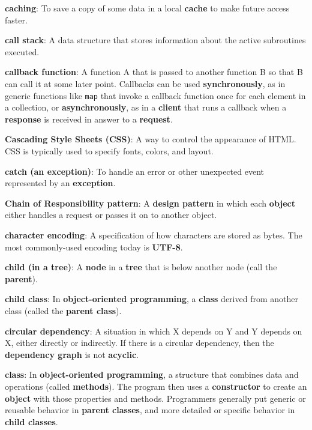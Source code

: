\documentclass[krantzl]{krantz}
\newcommand{\glosskey}[1]{\textbf{#1}}
\begin{document}
\noindent \textbf{\glosskey{caching}}: 
To save a copy of some data in a local \glosskey{cache} to make future access faster.


\noindent \textbf{\glosskey{call stack}}: 
A data structure that stores information about the active subroutines executed.


\noindent \textbf{\glosskey{callback function}}: 
A function A that is passed to another function B so that B can call it at some later point. Callbacks can be used \glosskey{synchronously}, as in generic functions like \texttt{map} that invoke a callback function once for each element in a collection, or \glosskey{asynchronously}, as in a \glosskey{client} that runs a callback when a \glosskey{response} is received in answer to a \glosskey{request}.


\noindent \textbf{\glosskey{Cascading Style Sheets} (CSS)}: 
A way to control the appearance of HTML. CSS is typically used to specify fonts, colors, and layout.


\noindent \textbf{\glosskey{catch (an exception)}}: 
To handle an error or other unexpected event represented by an \glosskey{exception}.


\noindent \textbf{\glosskey{Chain of Responsibility pattern}}: 
A \glosskey{design pattern} in which each \glosskey{object} either handles a request or passes it on to another object.


\noindent \textbf{\glosskey{character encoding}}: 
A specification of how characters are stored as bytes. The most commonly-used encoding today is \glosskey{UTF-8}.


\noindent \textbf{\glosskey{child (in a tree)}}: 
A \glosskey{node} in a \glosskey{tree} that is below another node (call the \glosskey{parent}).


\noindent \textbf{\glosskey{child class}}: 
In \glosskey{object-oriented programming}, a \glosskey{class} derived from another class (called the \glosskey{parent class}).


\noindent \textbf{\glosskey{circular dependency}}: 
A situation in which X depends on Y and Y depends on X, either directly or indirectly. If there is a circular dependency, then the \glosskey{dependency graph} is not \glosskey{acyclic}.


\noindent \textbf{\glosskey{class}}: 
In \glosskey{object-oriented programming}, a structure that combines data and operations (called \glosskey{methods}). The program then uses a \glosskey{constructor} to create an \glosskey{object} with those properties and methods. Programmers generally put generic or reusable behavior in \glosskey{parent classes}, and more detailed or specific behavior in \glosskey{child classes}.
\end{document}

